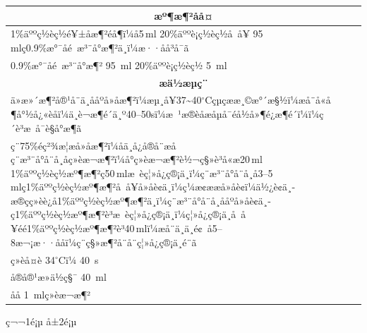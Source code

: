 \documentclass[UTF8,10pt,a4paper,fontset=fandol]{ctexart}
\newcommand{\fieldvalue}[1]{#1}
\newcommand{\handwritten}[1]{#1}
\begin{document}
\begin{center}
\begin{center}
\noindent
\begin{tabularx}{\textwidth}{|X|}
\hline
\multicolumn{1}{|c|}{\textbf{æº¶æ¶²åå¤}}\\
\hline
1\%äººç½èç½é¥±åæ¶²éå¶ï¼å5\,ml 20\%äººè¡ç½èç½å å¥
95\,mlç0.9\%æ°¯åé æ³¨å°æ¶²ä¸­ï¼æ··åå³å¯ã\\[2pt]
0.9\%æ°¯åé æ³¨å°æ¶²\quad
\fieldvalue{\handwritten{95}}\ ml
\hfill
20\%äººè¡ç½èç½\quad
\fieldvalue{\handwritten{5}}\ ml\\
\hline
\multicolumn{1}{|c|}{\textbf{æä½æµç¨}}\\
\hline
ä»æ»´æ¶²å®¹å¨ä¸­ååºå»å­æ¶²ï¼æµ¸å¥37\textasciitilde40\({}^{\circ}\)Cçµç­ææ¸©æ°´æ§½ï¼æå¨å«å¶å°½å¿«èåï¼ä¸è¬æ¶é´ä¸º40--50sï¼æ ¹æ®èåæåµå¯éå½å»¶é¿æ¶é´ï¼ï¼ç´è³æ å¯è§å°æ¶ã\\
ç¨75\%éç²¾æ¦æ­å»å­æ¶²ï¼åä¸å¿å®å¨æåç¨æ³¨å°å¨å¸åç»èæ¬æ¶²ï¼å°ç»èæ¬æ¶²è½¬ç§»è³å«æ20\,ml 1\%äººç½èç½æº¶æ¶²ç50\,mlæ èç¦»å¿ç®¡ä¸­ï¼ç¨æ³¨å°å¨å¸å3--5\,mlç1\%äººç½èç½æº¶æ¶²å å¥å»å­è¢ä¸­ï¼ç¼æ¢ææå»å­è¢ï¼ä½¿è¢ä¸­æ®çç»èè¿å1\%äººç½èç½æº¶æ¶²ä¸­ï¼ç¨æ³¨å°å¨å¸ååºå»å­è¢ä¸­ç1\%äººç½èç½æº¶æ¶²è³æ èç¦»å¿ç®¡ä¸­ï¼ç¦»å¿ç®¡ä¸­å å¥éé1\%äººç½èç½æº¶æ¶²è³40\,mlï¼æå¨ä¸ä¸é¢ å5--8æ¬¡æ··ååï¼ç¨ç§»æ¶²å¨å¨ç¦»å¿ç®¡ä¸é¨ã\\[3pt]
ç»èå¤è\quad
\fieldvalue{\handwritten{34}}\({}^{\circ}\)Cï¼
\quad
\fieldvalue{\handwritten{40}}\ s\\[3pt]
å®å®¹æ»ä½ç§¯\quad
\fieldvalue{\handwritten{40}}\ ml\\[3pt]
åå\quad
\fieldvalue{\handwritten{1}}\ mlç»èæ¬æ¶²\\
\hline
\end{tabularx}

\begin{center}
ç¬¬1é¡µ å±2é¡µ
\end{center}



\end{center}
\end{center}
\end{document}

